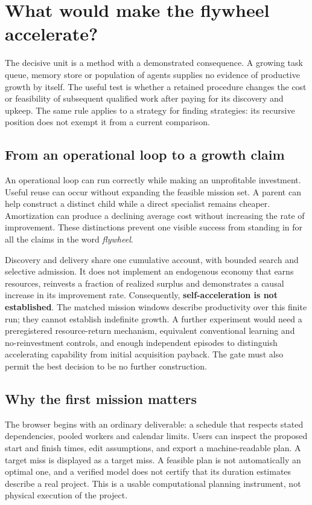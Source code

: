 \section{What would make the flywheel accelerate?}

The decisive unit is a method with a demonstrated consequence. A growing task queue, memory store or population of agents supplies no evidence of productive growth by itself. The useful test is whether a retained procedure changes the cost or feasibility of subsequent qualified work after paying for its discovery and upkeep. The same rule applies to a strategy for finding strategies: its recursive position does not exempt it from a current comparison.

\subsection{From an operational loop to a growth claim}

An operational loop can run correctly while making an unprofitable investment. Useful reuse can occur without expanding the feasible mission set. A parent can help construct a distinct child while a direct specialist remains cheaper. Amortization can produce a declining average cost without increasing the rate of improvement. These distinctions prevent one visible success from standing in for all the claims in the word \emph{flywheel}.

Discovery and delivery share one cumulative account, with bounded search and selective admission. It does not implement an endogenous economy that earns resources, reinvests a fraction of realized surplus and demonstrates a causal increase in its improvement rate. Consequently, \textbf{self-acceleration is not established}. The matched mission windows describe productivity over this finite run; they cannot establish indefinite growth. A further experiment would need a preregistered resource-return mechanism, equivalent conventional learning and no-reinvestment controls, and enough independent episodes to distinguish accelerating capability from initial acquisition payback. The gate must also permit the best decision to be no further construction.

\subsection{Why the first mission matters}

The browser begins with an ordinary deliverable: a schedule that respects stated dependencies, pooled workers and calendar limits. Users can inspect the proposed start and finish times, edit assumptions, and export a machine-readable plan. A target miss is displayed as a target miss. A feasible plan is not automatically an optimal one, and a verified model does not certify that its duration estimates describe a real project. This is a usable computational planning instrument, not physical execution of the project.

